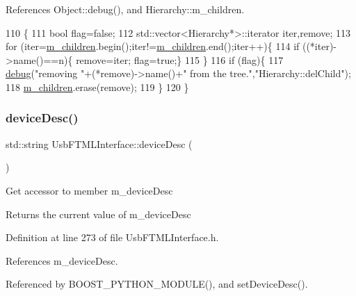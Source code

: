References Object\+::debug(), and Hierarchy\+::m\+\_\+children.


\begin{DoxyCode}
110                                    \{
111   \textcolor{keywordtype}{bool} flag=\textcolor{keyword}{false};
112   std::vector<Hierarchy*>::iterator iter,\textcolor{keyword}{remove};
113   \textcolor{keywordflow}{for} (iter=\hyperlink{classHierarchy_a038816763941fd4a930504917f60483b}{m\_children}.begin();iter!=\hyperlink{classHierarchy_a038816763941fd4a930504917f60483b}{m\_children}.end();iter++)\{
114     \textcolor{keywordflow}{if} ((*iter)->name()==n)\{ \textcolor{keyword}{remove}=iter; flag=\textcolor{keyword}{true};\}
115   \}
116   \textcolor{keywordflow}{if} (flag)\{
117     \hyperlink{classObject_aac010553f022165573714b7014a15f0d}{debug}(\textcolor{stringliteral}{"removing "}+(*remove)->name()+\textcolor{stringliteral}{" from the tree."},\textcolor{stringliteral}{"Hierarchy::delChild"});
118     \hyperlink{classHierarchy_a038816763941fd4a930504917f60483b}{m\_children}.erase(\textcolor{keyword}{remove});
119   \}
120 \}
\end{DoxyCode}
\mbox{\label{classUsbFTMLInterface_ab541b4c57c1e7e947037acbfebc3fe3b}} 
\subsubsection{\texorpdfstring{device\+Desc()}{deviceDesc()}}
{\footnotesize\ttfamily std\+::string Usb\+F\+T\+M\+L\+Interface\+::device\+Desc (\begin{DoxyParamCaption}{ }\end{DoxyParamCaption})\hspace{0.3cm}{\ttfamily [inline]}}

Get accessor to member m\+\_\+device\+Desc \begin{DoxyReturn}{Returns}
the current value of m\+\_\+device\+Desc 
\end{DoxyReturn}


Definition at line 273 of file Usb\+F\+T\+M\+L\+Interface.\+h.



References m\+\_\+device\+Desc.



Referenced by B\+O\+O\+S\+T\+\_\+\+P\+Y\+T\+H\+O\+N\+\_\+\+M\+O\+D\+U\+L\+E(), and set\+Device\+Desc().


